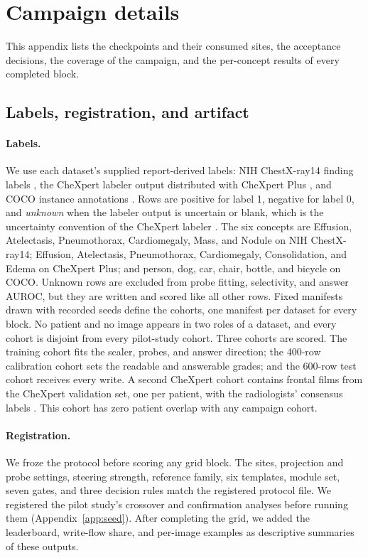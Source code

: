 \section{Campaign details}
\label{app:campaign}

This appendix lists the checkpoints and their consumed sites, the acceptance decisions, the coverage of the campaign, and the per-concept results of every completed block.

\subsection{Labels, registration, and artifact}
\label{app:cf-labels}

\paragraph{Labels.} We use each dataset's supplied report-derived labels: NIH ChestX-ray14 finding labels \citep{wang2017chestxray}, the CheXpert labeler output \citep{irvin2019chexpert} distributed with CheXpert Plus \citep{chambon2024chexpertplus}, and COCO instance annotations \citep{lin2014coco}. Rows are positive for label 1, negative for label 0, and \emph{unknown} when the labeler output is uncertain or blank, which is the uncertainty convention of the CheXpert labeler \citep{irvin2019chexpert}. The six concepts are Effusion, Atelectasis, Pneumothorax, Cardiomegaly, Mass, and Nodule on NIH ChestX-ray14; Effusion, Atelectasis, Pneumothorax, Cardiomegaly, Consolidation, and Edema on CheXpert Plus; and person, dog, car, chair, bottle, and bicycle on COCO. Unknown rows are excluded from probe fitting, selectivity, and answer AUROC, but they are written and scored like all other rows. Fixed manifests drawn with recorded seeds define the cohorts, one manifest per dataset for every block. No patient and no image appears in two roles of a dataset, and every cohort is disjoint from every pilot-study cohort. Three cohorts are scored. The training cohort fits the scaler, probes, and answer direction; the 400-row calibration cohort sets the readable and answerable grades; and the 600-row test cohort receives every write. A second CheXpert cohort contains \cfValidRows{} frontal films from the CheXpert validation set, one per patient, with the radiologists' consensus labels \citep{irvin2019chexpert}. This cohort has zero patient overlap with any campaign cohort.

\paragraph{Registration.} We froze the protocol before scoring any grid block. The sites, projection and probe settings, steering strength, reference family, six templates, module set, seven gates, and three decision rules match the registered protocol file. We registered the pilot study's crossover and confirmation analyses before running them (Appendix~\ref{app:seed}). After completing the grid, we added the leaderboard, write-flow share, and per-image examples as descriptive summaries of these outputs.

